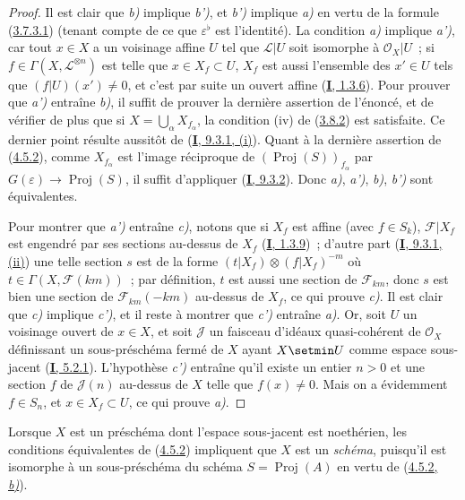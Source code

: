 \begin{proof}
Il est clair que \emph{b)} implique \emph{b')}, et \emph{b')} implique \emph{a)} en vertu de la formule
(\hyperref[II.3.7.3.1-fr]{3.7.3.1}) (tenant compte de ce que
$\varepsilon^\flat$ est l'identité). La condition \emph{a)} implique \emph{a')}, car tout
$x\in X$ a un voisinage affine $U$ tel que
$\mathcal{L}|U$ soit isomorphe à $\mathcal{O}_X|U$~; si
$f\in\Gamma(X,\mathcal{L}^{\otimes n})$ est telle que $x\in X_f\subset U$,
$X_f$ est aussi l'ensemble des $x'\in U$ tels que $(f|U)(x')\neq0$, et c'est
par suite un ouvert affine (\hyperref[I.1.3.6-fr]{\textbf{I}, 1.3.6}). Pour prouver
que \emph{a')} entraîne \emph{b)}, il suffit de prouver la dernière assertion de l'énoncé,
et de vérifier de plus que si $X=\bigcup_\alpha X_{f_\alpha}$, la condition
(iv) de (\hyperref[II.3.8.2-fr]{3.8.2}) est satisfaite. Ce dernier point
résulte aussitôt de (\hyperref[I.9.3.1-fr]{\textbf{I}, 9.3.1, (i)}). Quant à la
dernière assertion de (\hyperref[II.4.5.2-fr]{4.5.2}), comme
$X_{f_\alpha}$ est l'image réciproque de
$(\operatorname{Proj}(S))_{f_\alpha}$ par
$G(\varepsilon)\to\operatorname{Proj}(S)$, il suffit d'appliquer
(\hyperref[I.9.3.2-fr]{\textbf{I}, 9.3.2}). Donc \emph{a)}, \emph{a')}, \emph{b)}, \emph{b')} sont équivalentes.

Pour montrer que \emph{a')} entraîne \emph{c)}, notons que si $X_f$ est affine (avec
$f\in S_k$), $\mathcal{F}|X_f$ est engendré par ses sections au-dessus de
$X_f$ (\hyperref[I.1.3.9-fr]{\textbf{I}, 1.3.9})~; d'autre part
(\hyperref[I.9.3.1-fr]{\textbf{I}, 9.3.1, (ii)}) une telle section $s$ est de la forme
$(t|X_f)\otimes(f|X_f)^{-m}$ où
$t\in\Gamma(X,\mathcal{F}(km))$~; par définition, $t$ est aussi une section
de $\mathcal{F}_{km}$, donc $s$ est bien une section de
$\mathcal{F}_{km}(-km)$ au-dessus de $X_f$, ce qui prouve \emph{c)}. Il est clair
que \emph{c)} implique \emph{c')}, et il reste à montrer que \emph{c')} entraîne \emph{a)}. Or, soit $U$
un voisinage ouvert de $x\in X$, et soit $\mathcal{J}$ un faisceau d'idéaux
quasi-cohérent de $\mathcal{O}_X$ définissant un sous-préschéma fermé de $X$
ayant $X\setmin U$ comme espace sous-jacent
(\hyperref[I.5.2.1-fr]{\textbf{I}, 5.2.1}). L'hypothèse \emph{c')} entraîne qu'il existe un
entier $n>0$ et une section $f$ de $\mathcal{J}(n)$ au-dessus de $X$ telle
que $f(x)\neq0$. Mais on a évidemment $f\in S_n$, et $x\in X_f\subset U$, ce
qui prouve \emph{a)}.
\end{proof}

Lorsque $X$ est un préschéma dont l'espace sous-jacent est noethérien, les
conditions équivalentes de (\hyperref[II.4.5.2-fr]{4.5.2}) impliquent que
$X$ est un \emph{schéma}, puisqu'il est isomorphe à un sous-préschéma du schéma
$S=\operatorname{Proj}(A)$ en vertu de
(\hyperref[II.4.5.2-fr]{4.5.2, \emph{b)}}).

